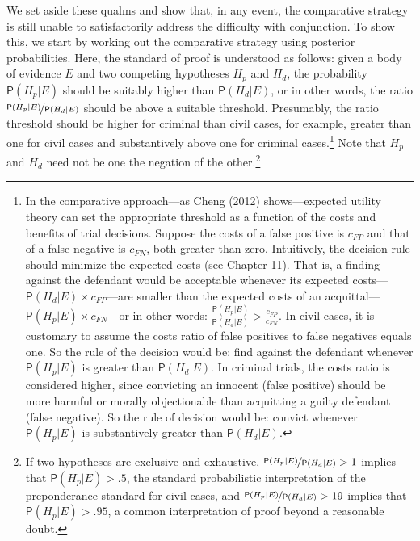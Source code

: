 \documentclass[
  10pt,
  dvipsnames,enabledeprecatedfontcommands]{scrartcl}
\newcommand{\pr}[1]{\ensuremath{\mathsf{P}(#1)}}
\begin{document}
We set aside these qualms and show that, in any event, the comparative
strategy is still unable to satisfactorily address the difficulty with
conjunction. To show this, we start by working out the comparative
strategy using posterior probabilities. Here, the standard of proof is
understood as follows: given a body of evidence \(E\) and two competing
hypotheses \(H_p\) and \(H_d\), the probability \(\pr{H_p \vert E}\)
should be suitably higher than \(\pr{H_d \vert E}\), or in other words,
the ratio \(\nicefrac{\pr{H_p \vert E}}{\pr{H_d \vert E}}\) should be
above a suitable threshold. Presumably, the ratio threshold should be
higher for criminal than civil cases, for example, greater than one for
civil cases and substantively above one for criminal
cases.\footnote{In the comparative
  approach---as Cheng (2012) shows---expected utility theory can set the
  appropriate threshold as a function of the costs and benefits of trial
  decisions. Suppose the costs of a false positive is \(c_{FP}\) and
  that of a false negative is \(c_{FN}\), both greater than zero.
  Intuitively, the decision rule should minimize the expected costs (see
  Chapter 11). That is, a finding against the defendant would be
  acceptable whenever its expected
  costs---\(\pr{H_d \vert E} \times c_{FP}\)---are smaller than the
  expected costs of an
  acquittal---\(\pr{H_p \vert E}\times c_{FN}\)---or in other words:
  \(\frac{\pr{H_p \vert E}}{\pr{H_d \vert E}} > \frac{c_{FP}}{c_{FN}}\).
  In civil cases, it is customary to assume the costs ratio of false
  positives to false negatives equals one. So the rule of the decision
  would be: find against the defendant whenever \(\pr{H_p \vert E}\) is
  greater than \(\pr{H_d \vert E}\). In criminal trials, the costs ratio
  is considered higher, since convicting an innocent (false positive)
  should be more harmful or morally objectionable than acquitting a
  guilty defendant (false negative). So the rule of decision would be:
  convict whenever \(\pr{H_p \vert E}\) is substantively greater than
  \(\pr{H_d \vert E}\).} Note that \(H_p\) and \(H_d\) need not be one
the negation of the other.\footnote{If two hypotheses are exclusive and
  exhaustive, \(\nicefrac{\pr{H_p \vert E}}{\pr{H_d \vert E}}>1\)
  implies that \(\pr{H_p \vert E}>.5\), the standard probabilistic
  interpretation of the preponderance standard for civil cases, and
  \(\nicefrac{\pr{H_p \vert E}}{\pr{H_d \vert E}}>19\) implies that
  \(\pr{H_p \vert E}>.95\), a common interpretation of proof beyond a
  reasonable doubt.}
\end{document}
